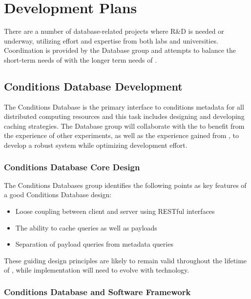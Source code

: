 \documentclass[../main-v1.tex]{subfiles}
\begin{document}
\section{Development Plans  }

There are a number of database-related projects where R\&D is needed or underway, utilizing effort 
and expertise from both  labs and universities.  Coordination is provided by the Database group and attempts to balance the short-term needs of  with the longer term needs of .

\subsection{Conditions Database Development}
\label{sec:db:conddbdev}

The Conditions Database is the primary interface to conditions metadata for all  distributed computing resources and this task includes designing and developing caching strategies.  The  Database group will collaborate with the  to benefit from the experience of other  experiments, as well as the experience gained from , to develop a robust system while optimizing development effort.

\subsubsection{Conditions Database Core Design}

The  Conditions Databases group identifies the following points as key features of a good Conditions Database design:

\begin{itemize}
    \item    Loose coupling between client and server using RESTful interfaces
    \item    The ability to cache queries as well as payloads
    \item    Separation of payload queries from metadata queries
\end{itemize}

These guiding design principles are likely to remain valid throughout the lifetime of , while implementation will need to evolve with technology.

\subsubsection{Conditions Database and Software Framework}
\end{document}
